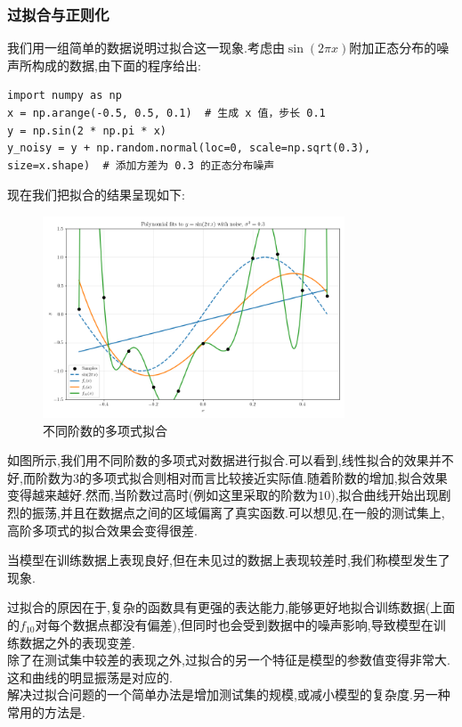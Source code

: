 \documentclass{ctexart}
\begin{document}
\subsubsection{过拟合与正则化}
我们用一组简单的数据说明过拟合这一现象.考虑由$\sin(2\pi x)$附加正态分布的噪声所构成的数据,由下面的程序给出:
\begin{lstlisting}
import numpy as np
x = np.arange(-0.5, 0.5, 0.1)  # 生成 x 值，步长 0.1
y = np.sin(2 * np.pi * x)
y_noisy = y + np.random.normal(loc=0, scale=np.sqrt(0.3), size=x.shape)  # 添加方差为 0.3 的正态分布噪声
\end{lstlisting}
现在我们把拟合的结果呈现如下:
\begin{figure}[H]
    \centering
    \includegraphics[width=0.8\textwidth]{figure/overfitting.png}
    \caption{不同阶数的多项式拟合}
\end{figure}
如图所示,我们用不同阶数的多项式对数据进行拟合.可以看到,线性拟合的效果并不好,而阶数为$3$的多项式拟合则相对而言比较接近实际值.随着阶数的增加,拟合效果变得越来越好.然而,当阶数过高时(例如这里采取的阶数为$10$),拟合曲线开始出现剧烈的振荡,并且在数据点之间的区域偏离了真实函数.可以想见,在一般的测试集上,高阶多项式的拟合效果会变得很差.
\begin{definition}[过拟合]
    当模型在训练数据上表现良好,但在未见过的数据上表现较差时,我们称模型发生了现象.
\end{definition}
\indent 过拟合的原因在于,复杂的函数具有更强的表达能力,能够更好地拟合训练数据(上面的$f_{10}$对每个数据点都没有偏差),但同时也会受到数据中的噪声影响,导致模型在训练数据之外的表现变差.\\
\indent 除了在测试集中较差的表现之外,过拟合的另一个特征是模型的参数值变得非常大.这和曲线的明显振荡是对应的.\\
\indent 解决过拟合问题的一个简单办法是增加测试集的规模,或减小模型的复杂度.另一种常用的方法是.
\end{document}
